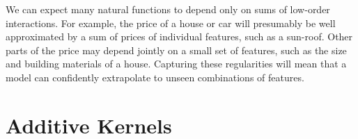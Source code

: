 

We can expect many natural functions to depend only on sums of low-order interactions.  For example, the price of a house or car will presumably be well approximated by a sum of prices of individual features, such as a sun-roof.  
Other parts of the price may depend jointly on a small set of features, such as the size and building materials of a house.
Capturing these regularities will mean that a model can confidently extrapolate to unseen combinations of features.





\section{Additive Kernels}


